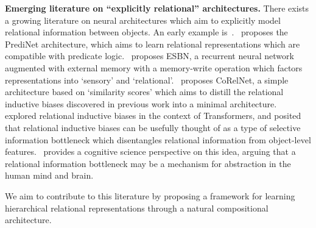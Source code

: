\textbf{Emerging literature on ``explicitly relational'' architectures.} There exists a growing literature on neural architectures which aim to explicitly model relational information between objects. An early example is~\citep{santoroSimpleNeural2017}.~\citet{shanahanExplicitlyRelationalNeural} proposes the PrediNet architecture, which aims to learn relational representations which are compatible with predicate logic.~\citet{webbEmergentSymbols2021} proposes ESBN, a recurrent neural network augmented with external memory with a memory-write operation which factors representations into `sensory' and `relational'.~\citet{kergNeuralArchitecture2022} proposes CoRelNet, a simple architecture based on `similarity scores' which aims to distill the relational inductive biases discovered in previous work into a minimal architecture.~\citet{altabaaAbstractorsTransformer2023} explored relational inductive biases in the context of Transformers, and posited that relational inductive biases can be usefully thought of as a type of selective information bottleneck which disentangles relational information from object-level features.~\citet{webbRelationalBottleneckInductive2023} provides a cognitive science perspective on this idea, arguing that a relational information bottleneck may be a mechanism for abstraction in the human mind and brain.

We aim to contribute to this literature by proposing a framework for learning hierarchical relational representations through a natural compositional architecture. %